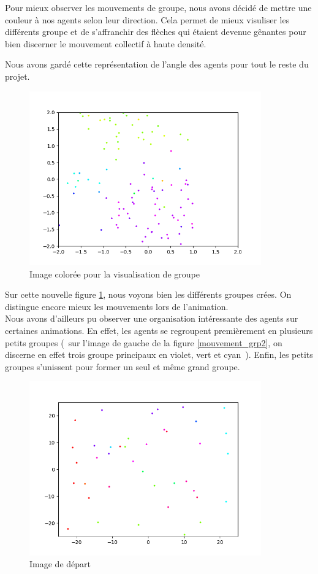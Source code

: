 \documentclass[french, a4paper, 12pt, openany]{report}
\begin{document}
   Pour mieux observer les mouvements de groupe, nous avons décidé de mettre une couleur à nos agents selon leur direction. Cela permet de mieux visuliser les différents groupe et de s'affranchir des flèches qui étaient devenue gênantes pour bien discerner le mouvement collectif à haute densité.
   
   Nous avons gardé cette représentation de l'angle des agents pour tout le reste du projet.
   
   \begin{figure}[!h]
		\centering
		\includegraphics[width=10cm]{images/image_6.png}
		\caption{Image colorée pour la visualisation de groupe}
		\label{couleurs_image}
	\end{figure}  
   
   Sur cette nouvelle figure \ref{couleurs_image}, nous voyons bien les différents groupes crées. On distingue encore mieux les mouvements lors de l'animation.\\
   
   Nous avons d'ailleurs pu observer une organisation intéressante des agents sur certaines animations. En effet, les agents se regroupent premièrement en plusieurs petits groupes (~sur l'image de gauche de la figure \ref{mouvement_grp2}, on discerne en effet trois groupe principaux en violet, vert et cyan~). Enfin, les petits groupes s'unissent pour former un seul et même grand groupe.
   
    \begin{figure}[!h]
		\centering
		\includegraphics[width=10cm]{images/image_8.png}
		\caption{Image de départ }
		\label{mouvement_grp}
	\end{figure} 
	
\end{document}

